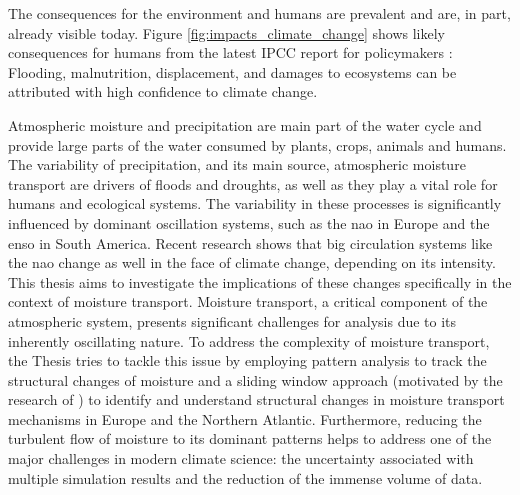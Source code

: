 The consequences for the environment and humans are prevalent and are, in part, already visible today. 
Figure \ref{fig:impacts_climate_change} shows likely consequences for humans from the latest IPCC report for policymakers \cite{lee2024climate}: Flooding, malnutrition, displacement, and damages to ecosystems can be attributed with high confidence to climate change. 

Atmospheric moisture and precipitation are main part of the water cycle and provide large parts of the water consumed by plants, crops, animals and humans. 
The variability of precipitation, and its main source, atmospheric moisture transport are drivers of floods and droughts, as well as they play a vital role for humans and ecological systems.  
The variability in these processes is significantly influenced by dominant oscillation systems, such as the \ac{nao} in Europe and the \ac{enso} in South America.
Recent research shows that big circulation systems like the \ac{nao} \cite{vietinghoff_visual_2021} change as well in the face of climate change, depending on its intensity.  
This thesis aims to investigate the implications of these changes specifically in the context of moisture transport.
Moisture transport, a critical component of the atmospheric system, presents significant challenges for analysis due to its inherently oscillating nature.
To address the complexity of moisture transport, the Thesis tries to tackle this issue by employing pattern analysis to track the structural changes of moisture and a sliding window approach (motivated by the research of \citeauthor{vietinghoff_visual_2021}) to identify and understand structural changes in moisture transport mechanisms in Europe and the Northern Atlantic. 
Furthermore, reducing the turbulent flow of moisture to its dominant patterns helps to address one of the major challenges in modern climate science: the uncertainty associated with multiple simulation results and the reduction of the immense volume of data. 

